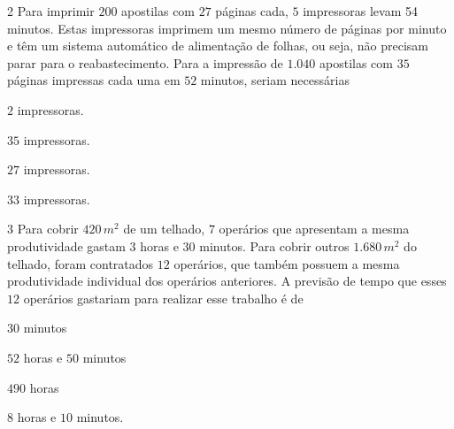 \num{2}  Para imprimir $200$ apostilas com $27$ páginas cada, $5$ impressoras levam
54 minutos. Estas impressoras imprimem um mesmo número de páginas por
minuto e têm um sistema automático de alimentação de folhas, ou seja,
não precisam parar para o reabastecimento. Para a impressão de $1.040$
apostilas com $35$ páginas impressas cada uma em $52$ minutos, seriam
necessárias

\begin{escolha}
\item $2$ impressoras.
\item $35$ impressoras.
\item $27$ impressoras.
\item $33$ impressoras.
\end{escolha}



\num{3}  Para cobrir $420\,m^2$ de um telhado, $7$ operários que apresentam a mesma
produtividade gastam $3$ horas e $30$ minutos. Para cobrir outros $1.680\,m^2$
do telhado, foram contratados $12$ operários, que também possuem a mesma
produtividade individual dos operários anteriores. A previsão de tempo
que esses $12$ operários gastariam para realizar esse trabalho é de

\begin{multicols}{2}
\begin{escolha}
\item $30$ minutos
\item $52$ horas e $50$ minutos
\item $490$ horas
\item $8$ horas e $10$ minutos.
\end{escolha}
\end{multicols}

